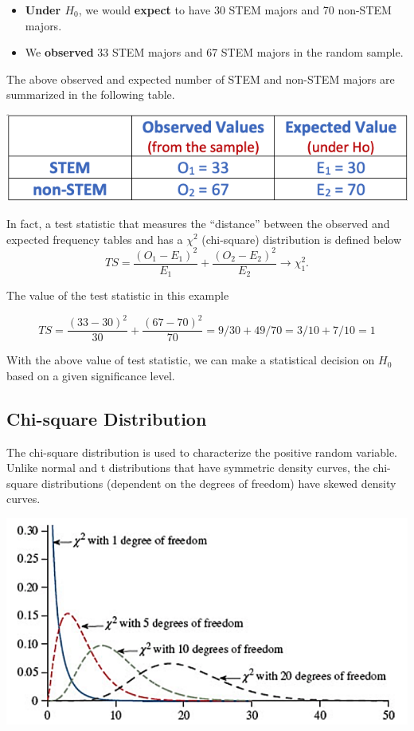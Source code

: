 \documentclass[
]{book}
\begin{document}
\begin{itemize}
\item
  \textbf{Under \(H_0\)}, we would \textbf{expect} to have 30 STEM majors and 70 non-STEM majors.
\item
  We \textbf{observed} 33 STEM majors and 67 STEM majors in the random sample.
\end{itemize}

The above observed and expected number of STEM and non-STEM majors are summarized in the following table.

\begin{center}\includegraphics[width=0.5\linewidth]{week13/example01-ExpObsTable} \end{center}

In fact, a test statistic that measures the ``distance'' between the observed and expected frequency tables and has a \(\chi^2\) (chi-square) distribution is defined below
\[
TS = \frac{(O_1 - E_1)^2}{E_1} + \frac{(O_2 - E_2)^2}{E_2} \to \chi_1^2.
\]

The value of the test statistic in this example

\[TS = \frac{(33-30)^2}{30} + \frac{(67-70)^2}{70} = 9/30 + 49/70 = 3/10 + 7/10 = 1\]

With the above value of test statistic, we can make a statistical decision on \(H_0\) based on a given significance level.

\hypertarget{chi-square-distribution}{%
\subsection{Chi-square Distribution}\label{chi-square-distribution}}

The chi-square distribution is used to characterize the positive random variable. Unlike normal and t distributions that have symmetric density curves, the chi-square distributions (dependent on the degrees of freedom) have skewed density curves.

\begin{center}\includegraphics[width=0.6\linewidth]{week13/chisqDensity} \end{center}
\end{document}
